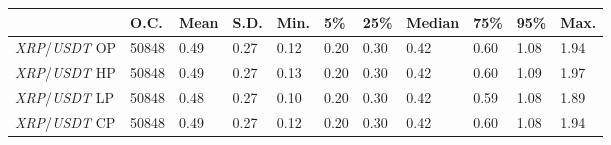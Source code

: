 \begin{tabular}{lllllllllll}
\toprule
 & \textbf{O.C.} & \textbf{Mean} & \textbf{S.D.} & \textbf{Min.} & \textbf{5\%} & \textbf{25\%} & \textbf{Median} & \textbf{75\%} & \textbf{95\%} & \textbf{Max.} \\
\midrule
\emph{XRP}/\emph{USDT} OP & 50848 & 0.49 & 0.27 & 0.12 & 0.20 & 0.30 & 0.42 & 0.60 & 1.08 & 1.94 \\
\emph{XRP}/\emph{USDT} HP & 50848 & 0.49 & 0.27 & 0.13 & 0.20 & 0.30 & 0.42 & 0.60 & 1.09 & 1.97 \\
\emph{XRP}/\emph{USDT} LP & 50848 & 0.48 & 0.27 & 0.10 & 0.20 & 0.30 & 0.42 & 0.59 & 1.08 & 1.89 \\
\emph{XRP}/\emph{USDT} CP & 50848 & 0.49 & 0.27 & 0.12 & 0.20 & 0.30 & 0.42 & 0.60 & 1.08 & 1.94 \\
\bottomrule
\end{tabular}
